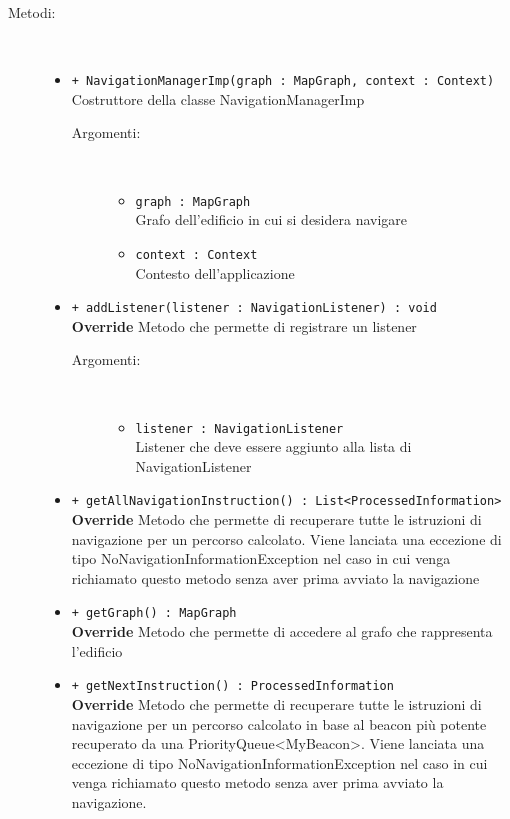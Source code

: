 \documentclass[../DefinizioneDiProdotto.tex]{subfiles}
\begin{document}
\begin{description}
\begin{itemize}
	\end{itemize}
	\item[Metodi:] \
	\begin{itemize}
		\item \texttt{+ NavigationManagerImp(graph : MapGraph, context : Context)}\\
		Costruttore della classe NavigationManagerImp
		\begin{description}
			\item[Argomenti:] \
			\begin{itemize}
				\item \texttt{graph : MapGraph}\\
				Grafo dell'edificio in cui si desidera navigare\item \texttt{context : Context}\\
				Contesto dell'applicazione\end{itemize}
		\end{description}
		\item \texttt{+ addListener(listener : NavigationListener) : void}\\
		\textbf{Override} Metodo che permette di registrare un listener
		\begin{description}
			\item[Argomenti:] \
			\begin{itemize}
				\item \texttt{listener : NavigationListener}\\
				Listener che deve essere aggiunto alla lista di NavigationListener\end{itemize}
		\end{description}
		\item \texttt{+ getAllNavigationInstruction() : List<ProcessedInformation>}\\
		\textbf{Override} Metodo che permette di recuperare tutte le istruzioni di navigazione per un percorso calcolato. Viene lanciata una eccezione di tipo NoNavigationInformationException nel caso in cui venga richiamato questo metodo senza aver prima avviato la navigazione
		\item \texttt{+ getGraph() : MapGraph}\\
		\textbf{Override} Metodo che permette di accedere al grafo che rappresenta l'edificio
		\item \texttt{+ getNextInstruction() : ProcessedInformation}\\
		\textbf{Override} Metodo che permette di recuperare tutte le istruzioni di navigazione per un percorso calcolato in base al beacon più potente recuperato da una PriorityQueue<MyBeacon>. Viene lanciata una eccezione di tipo NoNavigationInformationException nel caso in cui venga richiamato questo metodo senza aver prima avviato la navigazione.

\end{itemize}
\end{description}
\end{document}
